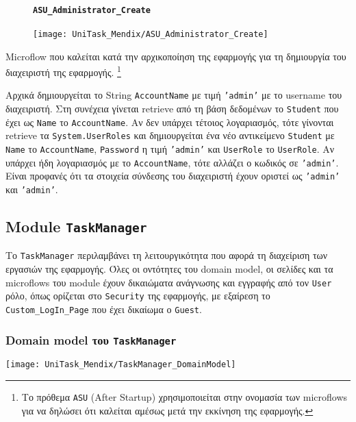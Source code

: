                 \begin{figure}[H] \noindent
                    \paragraph{\texttt{ASU\_Administrator\_Create}}
                    \begin{center}
                        \texttt{[image: UniTask\_Mendix/ASU\_Administrator\_Create]}
                    \end{center}
                \end{figure}

                    Microflow που καλείται κατά την αρχικοποίηση της εφαρμογής για τη δημιουργία του διαχειριστή της εφαρμογής. \footnote{Το πρόθεμα \texttt{ASU} (After Startup) χρησιμοποιείται στην ονομασία των microflows για να δηλώσει ότι καλείται αμέσως μετά την εκκίνηση της εφαρμογής.}

                    Αρχικά δημιουργείται το String \texttt{AccountName} με τιμή \texttt{'admin'} με το username του διαχειριστή. Στη συνέχεια γίνεται retrieve από τη βάση δεδομένων το \texttt{Student} που έχει ως \texttt{Name} το \texttt{AccountName}. Αν δεν υπάρχει τέτοιος λογαριασμός, τότε γίνονται retrieve τα \texttt{System.UserRoles} και δημιουργείται ένα νέο αντικείμενο \texttt{Student} με \texttt{Name} το \texttt{AccountName}, \texttt{Password} η τιμή \texttt{'admin'} και \texttt{UserRole} το \texttt{UserRole}. Αν υπάρχει ήδη λογαριασμός με το \texttt{AccountName}, τότε αλλάζει ο κωδικός σε \texttt{'admin'}. Είναι προφανές ότι τα στοιχεία σύνδεσης του διαχειριστή έχουν οριστεί ως \texttt{'admin'} και \texttt{'admin'}.

        \subsection{Module \texttt{TaskManager}}
            Το \texttt{TaskManager} περιλαμβάνει τη λειτουργικότητα που αφορά τη διαχείριση των εργασιών της εφαρμογής. Όλες οι οντότητες του domain model, οι σελίδες και τα microflows του module έχουν δικαιώματα ανάγνωσης και εγγραφής από τον \texttt{User} ρόλο, όπως ορίζεται στο \texttt{Security} της εφαρμογής, με εξαίρεση το \texttt{Custom\_LogIn\_Page} που έχει δικαίωμα ο \texttt{Guest}.

            \subsubsection{Domain model του \texttt{TaskManager}}
                \begin{center}
                    \texttt{[image: UniTask\_Mendix/TaskManager\_DomainModel]}
                \end{center}

